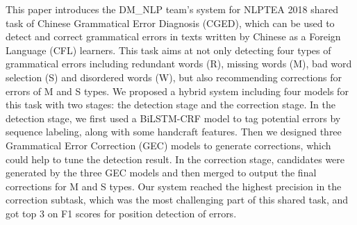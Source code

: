 This paper introduces the DM\_NLP team's system for NLPTEA 2018 shared task of Chinese Grammatical Error Diagnosis (CGED), which can be used to detect and correct grammatical errors in texts written by Chinese as a Foreign Language (CFL) learners. This task aims at not only detecting four types of grammatical errors including redundant words (R), missing words (M), bad word selection (S) and disordered words (W), but also recommending corrections for errors of M and S types. We proposed a hybrid system including four models for this task with two stages: the detection stage and the correction stage. In the detection stage, we first used a BiLSTM-CRF model to tag potential errors by sequence labeling, along with some handcraft features. Then we designed three Grammatical Error Correction (GEC) models to generate corrections, which could help to tune the detection result. In the correction stage, candidates were generated by the three GEC models and then merged to output the final corrections for M and S types. Our system reached the highest precision in the correction subtask, which was the most challenging part of this shared task, and got top 3 on F1 scores for position detection of errors.
